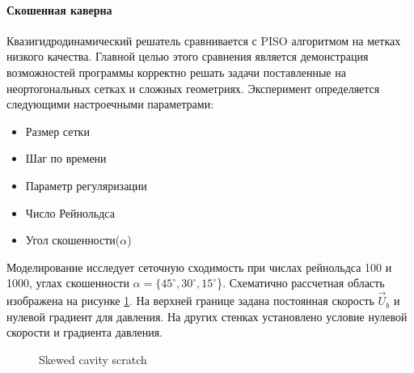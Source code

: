 \paragraph{Скошенная каверна}

Квазигидродинамический решатель сравнивается с PISO алгоритмом на метках низкого качества. Главной целью этого сравнения является демонстрация возможностей программы корректно решать задачи поставленные на неортогональных сетках и сложных геометриях. Эксперимент определяется следующими настроечными параметрами:

\begin{itemize}
    \item Размер сетки
    \item Шаг по времени
    \item Параметр регуляризации
    \item Число Рейнольдса
    \item Угол скошенности($\alpha$)
\end{itemize}

Моделирование исследует сеточную сходимость при числах рейнольдса 100 и 1000, углах скошенности $\alpha = \{45^{\circ}, 30^{\circ}, 15^{\circ}$\}. Схематично рассчетная область изображена на рисунке \ref{fig:skewedCavityScratch}. На верхней границе задана постоянная скорость $\vec{U}_b$ и нулевой градиент для давления. На других стенках установлено условие нулевой скорости и градиента давления.

\begin{figure}[!h]
    \centering
    \caption{Skewed cavity scratch}
    \label{fig:skewedCavityScratch}
\end{figure}

